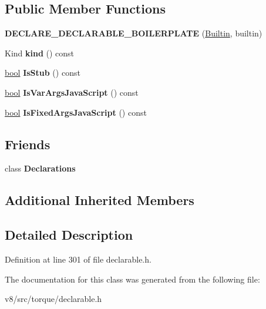 \subsection*{Public Member Functions}
\begin{DoxyCompactItemize}
\item 
\mbox{\label{classv8_1_1internal_1_1torque_1_1Builtin_a7e694e3e2c044535c26c6e28b8b2a9d3}} 
{\bfseries D\+E\+C\+L\+A\+R\+E\+\_\+\+D\+E\+C\+L\+A\+R\+A\+B\+L\+E\+\_\+\+B\+O\+I\+L\+E\+R\+P\+L\+A\+TE} (\mbox{\hyperlink{classv8_1_1internal_1_1torque_1_1Builtin}{Builtin}}, builtin)
\item 
\mbox{\label{classv8_1_1internal_1_1torque_1_1Builtin_aaeb360cdea47854dbc874e3d5bca3a02}} 
Kind {\bfseries kind} () const
\item 
\mbox{\label{classv8_1_1internal_1_1torque_1_1Builtin_a240f822ac45922a086c58ee5fc766878}} 
\mbox{\hyperlink{classbool}{bool}} {\bfseries Is\+Stub} () const
\item 
\mbox{\label{classv8_1_1internal_1_1torque_1_1Builtin_ac2947559a66fb9147c16de05d06950d9}} 
\mbox{\hyperlink{classbool}{bool}} {\bfseries Is\+Var\+Args\+Java\+Script} () const
\item 
\mbox{\label{classv8_1_1internal_1_1torque_1_1Builtin_a0bda03d0bd2b5112f76bbfd4e5b5a5f2}} 
\mbox{\hyperlink{classbool}{bool}} {\bfseries Is\+Fixed\+Args\+Java\+Script} () const
\end{DoxyCompactItemize}
\subsection*{Friends}
\begin{DoxyCompactItemize}
\item 
\mbox{\label{classv8_1_1internal_1_1torque_1_1Builtin_a23135931a5f054329315374b774718cf}} 
class {\bfseries Declarations}
\end{DoxyCompactItemize}
\subsection*{Additional Inherited Members}


\subsection{Detailed Description}


Definition at line 301 of file declarable.\+h.



The documentation for this class was generated from the following file\+:\begin{DoxyCompactItemize}
\item 
v8/src/torque/declarable.\+h\end{DoxyCompactItemize}

